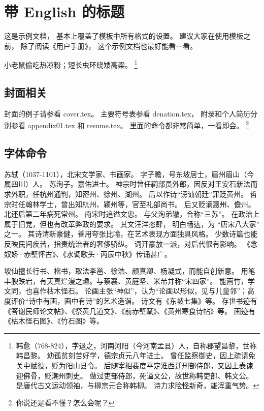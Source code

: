 ﻿%
% 
% 
% 
% 
% 

\chapter{带 English 的标题}
\label{chapter:main-content}

这是示例文档，
基本上覆盖了模板中所有格式的设置。
建议大家在使用模板之前，
除了阅读《用户手册》，
这个示例文档也最好能看一看。

{小老鼠偷吃热凉粉；短长虫环绕矮高粱。}
\footnote{韩愈（768-824），字退之，河南河阳（今河南孟县）人，自称郡望昌黎，世称韩昌黎。
幼孤贫刻苦好学，德宗贞元八年进士。
曾任监察御史，因上疏请免关中赋役，贬为阳山县令。
后随宰相裴度平定淮西迁刑部侍郎，又因上表谏迎佛骨，贬潮州刺史。
做过吏部侍郎，死谥文公，故世称韩吏部、韩文公。
是唐代古文运动领袖，与柳宗元合称韩柳。
诗力求险怪新奇，雄浑重气势。}


\section{封面相关}
封面的例子请参看 cover.tex。
主要符号表参看 denation.tex，
附录和个人简历分别参看 appendix01.tex 和 resume.tex。
里面的命令都非常简单，一看即会。
\footnote{你说还是看不懂？怎么会呢？}

\section{字体命令}\label{sec:first}

苏轼（1037-1101），北宋文学家、书画家。
字子瞻，号东坡居士，眉州眉山（今属四川）人。
苏洵子。嘉佑进士。
神宗时曾任祠部员外郎，因反对王安石新法而求外职，任杭州通判，知密州、徐州、湖州。
后以作诗“谤讪朝廷”罪贬黄州。
哲宗时任翰林学士，曾出知杭州、颖州等，官至礼部尚书。
后又贬谪惠州、儋州。
北还后第二年病死常州。
南宋时追谥文忠。
与父洵弟辙，合称“三苏”。
在政治上属于旧党，但也有改革弊政的要求。
其文汪洋恣肆，
明白畅达，为
{“唐宋八大家”} 之一。
其诗清新豪健，善用夸张比喻，在艺术表现方面独具风格。
少数诗篇也能反映民间疾苦，指责统治者的奢侈骄纵。
词开豪放一派，对后代很有影响。
《念奴娇·赤壁怀古》、《水调歌头·丙辰中秋》传诵甚广。

{\kaishu 坡仙擅长行书、楷书，取法李邕、徐浩、颜真卿、杨凝式，而能自创新意。
用笔丰腴跌宕，有天真烂漫之趣。与蔡襄、黄庭坚、米芾并称“宋四家”。
能画竹，学文同，也喜作枯木怪石。
论画主张“神似”，认为“论画以形似，见与儿童邻”；高度评价“诗中有画，画中有诗”的艺术造诣。
诗文有《东坡七集》等。
存世书迹有《答谢民师论文帖》、《祭黄几道文》、《前赤壁赋》、《黄州寒食诗帖》等。
画迹有《枯木怪石图》、《竹石图》等。}

